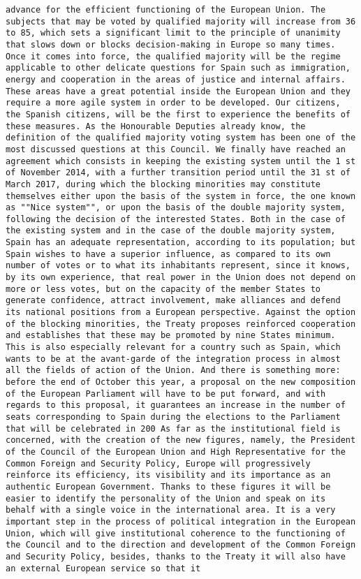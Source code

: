 \documentclass[
]{article}
\begin{document}
\begin{verbatim}
advance for the efficient functioning of the European Union. The subjects that may be voted by qualified majority will increase from 36 to 85, which sets a significant limit to the principle of unanimity that slows down or blocks decision-making in Europe so many times. Once it comes into force, the qualified majority will be the regime applicable to other delicate questions for Spain such as immigration, energy and cooperation in the areas of justice and internal affairs. These areas have a great potential inside the European Union and they require a more agile system in order to be developed. Our citizens, the Spanish citizens, will be the first to experience the benefits of these measures. As the Honourable Deputies already know, the definition of the qualified majority voting system has been one of the most discussed questions at this Council. We finally have reached an agreement which consists in keeping the existing system until the 1 st of November 2014, with a further transition period until the 31 st of March 2017, during which the blocking minorities may constitute themselves either upon the basis of the system in force, the one known as ""Nice system"", or upon the basis of the double majority system, following the decision of the interested States. Both in the case of the existing system and in the case of the double majority system, Spain has an adequate representation, according to its population; but Spain wishes to have a superior influence, as compared to its own number of votes or to what its inhabitants represent, since it knows, by its own experience, that real power in the Union does not depend on more or less votes, but on the capacity of the member States to generate confidence, attract involvement, make alliances and defend its national positions from a European perspective. Against the option of the blocking minorities, the Treaty proposes reinforced cooperation and establishes that these may be promoted by nine States minimum. This is also especially relevant for a country such as Spain, which wants to be at the avant-garde of the integration process in almost all the fields of action of the Union. And there is something more: before the end of October this year, a proposal on the new composition of the European Parliament will have to be put forward, and with regards to this proposal, it guarantees an increase in the number of seats corresponding to Spain during the elections to the Parliament that will be celebrated in 200 As far as the institutional field is concerned, with the creation of the new figures, namely, the President of the Council of the European Union and High Representative for the Common Foreign and Security Policy, Europe will progressively reinforce its efficiency, its visibility and its importance as an authentic European Government. Thanks to these figures it will be easier to identify the personality of the Union and speak on its behalf with a single voice in the international area. It is a very important step in the process of political integration in the European Union, which will give institutional coherence to the functioning of the Council and to the direction and development of the Common Foreign and Security Policy, besides, thanks to the Treaty it will also have an external European service so that it 
\end{verbatim}
\end{document}
